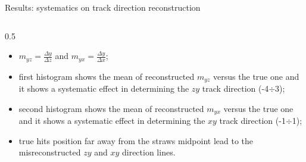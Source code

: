 \documentclass{beamer}[10pt]
\begin{document}
\begin{frame}{Results: systematics on track direction reconstruction}
\begin{columns}
\begin{column}{0.5\framewidth}
      \begin{itemize}
        \item $m_{yz}=\frac{\Delta y}{\Delta z}$ and $m_{yx}=\frac{\Delta y}{\Delta x}$;
        \vspace{2mm}
        \item first histogram shows the mean of reconstructed $m_{yz}$ versus the true one and it shows a systematic effect in determining the $zy$ track direction (-4$\div$3);
        \vspace{2mm}
        \item second histogram shows the mean of reconstructed $m_{yx}$ versus the true one and it shows a systematic effect in determining the $xy$ track direction (-1$\div$1);
        \vspace{2mm}
        \item true hits position far away from the straws midpoint lead to the misreconstructed $zy$ and $xy$ direction lines.
      \end{itemize}
    \end{column}
  \end{columns}
\end{frame}
\end{document}
